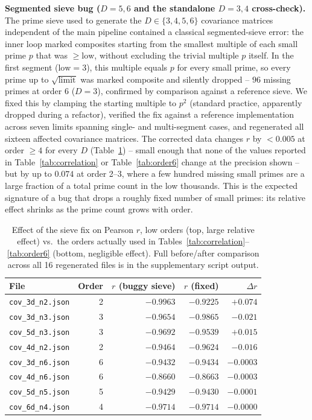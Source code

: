 \documentclass[11pt,a4paper]{article}
\begin{document}
\textbf{Segmented sieve bug ($D=5,6$ and the standalone $D=3,4$ cross-check).}
The prime sieve used to generate the $D\in\{3,4,5,6\}$ covariance matrices
independent of the main pipeline contained a classical segmented-sieve
error: the inner loop marked composites starting from the smallest multiple
of each small prime $p$ that was $\ge \mathrm{low}$, without excluding the
trivial multiple $p$ itself. In the first segment ($\mathrm{low}=3$), this
multiple equals $p$ for every small prime, so every prime up to
$\sqrt{\mathrm{limit}}$ was marked composite and silently dropped -- $96$
missing primes at order 6 ($D=3$), confirmed by comparison against a
reference sieve. We fixed this by clamping the starting multiple to
$p^2$ (standard practice, apparently dropped during a refactor), verified
the fix against a reference implementation across seven limits spanning
single- and multi-segment cases, and regenerated all sixteen affected
covariance matrices. The corrected data changes $r$ by $<0.005$ at order
$\ge4$ for every $D$ (Table~\ref{tab:sievefix}) -- small enough that none of
the values reported in Table~\ref{tab:correlation} or
Table~\ref{tab:order6} change at the precision shown -- but by up to $0.074$
at order 2--3, where a few hundred missing small primes are a large
fraction of a total prime count in the low thousands. This is the expected
signature of a bug that drops a roughly fixed number of small primes: its
relative effect shrinks as the prime count grows with order.

\begin{table}[h]
\centering
\small
\begin{tabular}{lrrrr}
\toprule
File & Order & $r$ (buggy sieve) & $r$ (fixed) & $\Delta r$\\
\midrule
\texttt{cov\_3d\_n2.json} & 2 & $-0.9963$ & $-0.9225$ & $+0.074$\\
\texttt{cov\_3d\_n3.json} & 3 & $-0.9654$ & $-0.9865$ & $-0.021$\\
\texttt{cov\_5d\_n3.json} & 3 & $-0.9692$ & $-0.9539$ & $+0.015$\\
\texttt{cov\_4d\_n2.json} & 2 & $-0.9464$ & $-0.9624$ & $-0.016$\\
\midrule
\texttt{cov\_3d\_n6.json} & 6 & $-0.9432$ & $-0.9434$ & $-0.0003$\\
\texttt{cov\_4d\_n6.json} & 6 & $-0.8660$ & $-0.8663$ & $-0.0003$\\
\texttt{cov\_5d\_n5.json} & 5 & $-0.9429$ & $-0.9430$ & $-0.0001$\\
\texttt{cov\_6d\_n4.json} & 4 & $-0.9714$ & $-0.9714$ & $-0.0000$\\
\bottomrule
\end{tabular}
\caption{Effect of the sieve fix on Pearson $r$, low orders (top, large
relative effect) vs.\ the orders actually used in
Tables~\ref{tab:correlation}--\ref{tab:order6} (bottom, negligible effect).
Full before/after comparison across all 16 regenerated files is in the
supplementary script output.}
\label{tab:sievefix}
\end{table}
\end{document}
